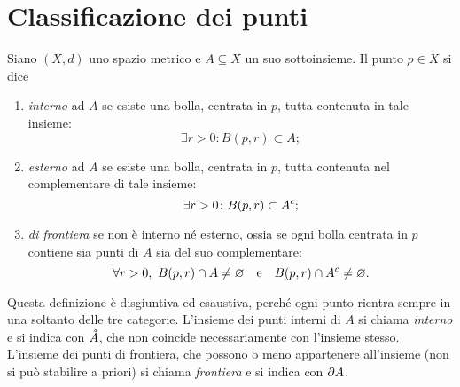 \section{Classificazione dei punti}
\begin{definizione}
Siano $(X,d)$ uno spazio metrico e $A\subseteq X$ un suo sottoinsieme. Il punto $p\in X$ si dice
\begin{enumerate}
\item \emph{interno} ad $A$ se esiste una bolla, centrata in $p$, tutta contenuta in tale insieme:
\[
	\exists r>0\colon B(p,r)\subset A;
\]
\item \emph{esterno} ad $A$ se esiste una bolla, centrata in $p$, tutta contenuta nel complementare di tale insieme:
\[
	\exists r>0\colon B(p,r)\subset{A}^c;
\]
\item \emph{di frontiera} se non è interno né esterno, ossia se ogni bolla centrata in $p$ contiene sia punti di $A$ sia del suo complementare:
\[
	\forall r>0,\ B(p,r)\cap A\neq\emptyset\qtext{e}B(p,r)\cap\compl{A}\neq\emptyset.
\]
\end{enumerate}
\end{definizione}
	Questa definizione è disgiuntiva ed esaustiva, perché ogni punto rientra sempre in una soltanto delle tre categorie.
	L'insieme dei punti interni di $A$ si chiama \emph{interno} e si indica con $\mathring{A}$, che non coincide necessariamente con l'insieme stesso. L'insieme dei punti di frontiera, che possono o meno appartenere all'insieme (non si può stabilire a priori) si chiama \emph{frontiera} e si indica con $\partial A$.
